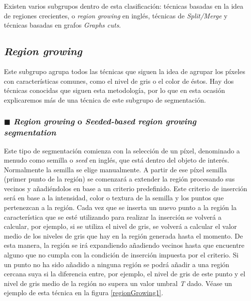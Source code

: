 Existen varios subgrupos dentro de esta clasificaci\'{o}n: t\'{e}cnicas basadas en la idea de regiones crecientes, o \textit{region growing} en ingl\'{e}s, t\'{e}cnicas de \textit{Split/Merge} y t\'{e}cnicas basadas en grafos \textit{Graphs cuts}.

\subsection{\textit{Region growing}}

Este subgrupo agrupa todos las t\'{e}cnicas que siguen la idea de agrupar los p\'{i}xeles con caracter\'{i}sticas comunes, como el nivel de gris o el color de \'{e}stos. Hay dos t\'{e}cnicas conocidas que siguen esta metodolog\'{i}a, por lo que en esta ocasi\'{o}n explicaremos m\'{a}s de una t\'{e}cnica de este subgrupo de segmentaci\'{o}n.

\subsubsection{$\blacksquare$ \quad \textit{Region growing} o \textit{Seeded-based region growing segmentation}}

Este tipo de segmentaci\'{o}n comienza con la selecci\'{o}n de un p\'{i}xel, denominado a menudo como semilla o \textit{seed} en ingl\'{e}s, que est\'{a} dentro del objeto de inter\'{e}s. Normalmente la semilla se elige manualmente. A partir de ese p\'{i}xel semilla (primer punto de la regi\'{o}n) se comenzar\'{a} a extender la regi\'{o}n procesando sus vecinos y a\~{n}adi\'{e}ndolos en base a un criterio predefinido. Este criterio de inserci\'{o}n ser\'{a} en base a la intensidad, color o textura de la semilla y los puntos que pertenezcan a la regi\'{o}n. Cada vez que se inserta un nuevo punto a la regi\'{o}n la caracter\'{i}stica que se est\'{e} utilizando para realizar la inserci\'{o}n se volver\'{a} a calcular, por ejemplo, si se utiliza el nivel de gris, se volver\'{a} a calcular el valor medio de los niveles de gris que hay en la regi\'{o}n generada hasta el momento. De esta manera, la regi\'{o}n se ir\'{a} expandiendo a\~{n}adiendo vecinos hasta que encuentre alguno que no cumpla con la condici\'{o}n de inserci\'{o}n impuesta por el criterio. Si un punto no ha sido a\~{n}adido a ninguna regi\'{o}n se podr\'{a} a\~{n}adir a una regi\'{o}n cercana suya si la diferencia entre, por ejemplo, el nivel de gris de este punto y el nivel de gris medio de la regi\'{o}n no supera un valor umbral \textit{T} dado. V\'{e}ase un ejemplo de esta t\'{e}cnica en la figura \ref{regionGrowing1}.

